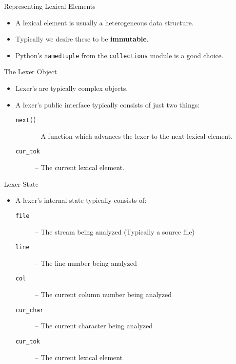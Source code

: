 \documentclass[handout]{beamer}
\newenvironment{code}{%
 \VerbatimEnvironment
 \begin{adjustbox}{max width=\textwidth, max height=0.7\textheight}
 \begin{BVerbatim}
  }{
  \end{BVerbatim}
 \end{adjustbox}
}
\begin{document}
\begin{frame}[fragile]{Representing Lexical Elements}

\begin{itemize}
    \item A lexical element is usually a heterogeneous data structure.
    \item Typically we desire these to be {\bf immutable}.
    \item Python's \texttt{namedtuple} from the \texttt{collections} module is a good choice.
\end{itemize}
\end{frame}

\begin{frame}[fragile]{The Lexer Object}
\begin{itemize}
    \item Lexer's are typically complex objects.
    \item A lexer's public interface typically consists of just two things:
    \begin{description}
        \item[\texttt{next()}] -- A function which advances the lexer to the next lexical element.
        \item[\texttt{cur\_tok}] --  The current lexical element.
    \end{description}
\end{itemize}
\end{frame}

\begin{frame}{Lexer State}
    \begin{itemize}
        \item A lexer's internal state typically consists of:
        \begin{description}
            \item[\texttt{file}] -- The stream being analyzed (Typically a source file)
            \item[\texttt{line}] -- The line number being analyzed
            \item[\texttt{col}] -- The current column number being analyzed
            \item[\texttt{cur\_char}] -- The current character being analyzed
            \item[\texttt{cur\_tok}] -- The current lexical element
        \end{description}
    \end{itemize}
\end{frame}
\end{document}
